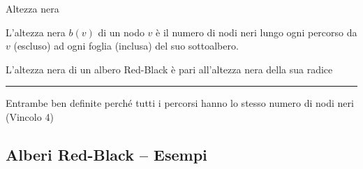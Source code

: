 \begin{frame}{Altezza nera}

\begin{myboxtitle}
L'\alert{altezza nera $b(v)$ di un nodo $v$} è il numero di nodi neri lungo ogni percorso da $v$ (escluso) ad ogni foglia (inclusa) del suo sottoalbero.
\end{myboxtitle}

\begin{myboxtitle}
L'\alert{altezza nera di un albero Red-Black} è pari all'altezza nera della sua radice
\end{myboxtitle}


\vspace{48pt}
\hrule

\vspace{6pt}
Entrambe ben definite perché tutti i percorsi hanno lo stesso numero di nodi neri (Vincolo 4)

\end{frame}

\subsection{Alberi Red-Black -- Esempi}

